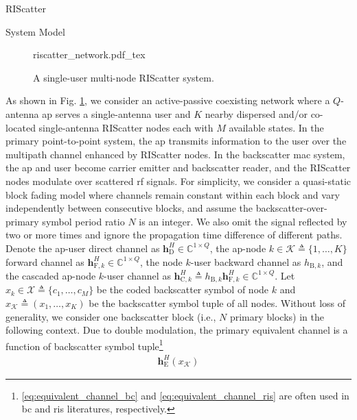\documentclass[journal]{IEEEtran}
\begin{document}
\begin{section}{RIScatter}
	\begin{subsection}{System Model}
		\begin{figure}[!t]
			\centering
			\def\svgwidth{0.8\columnwidth}
			\footnotesize{
				{riscatter_network.pdf_tex}
			}
			\caption{A single-user multi-node RIScatter system.}
			\label{fg:riscatter_network}
		\end{figure}
		As shown in Fig. \ref{fg:riscatter_network}, we consider an active-passive coexisting network where a $Q$-antenna \gls{ap} serves a single-antenna user and $K$ nearby dispersed and/or co-located single-antenna RIScatter nodes each with $M$ available states.
		In the primary point-to-point system, the \gls{ap} transmits information to the user over the multipath channel enhanced by RIScatter nodes.
		In the backscatter \gls{mac} system, the \gls{ap} and user become carrier emitter and backscatter reader, and the RIScatter nodes modulate over scattered \gls{rf} signals.
		For simplicity, we consider a quasi-static block fading model where channels remain constant within each block and vary independently between consecutive blocks, and assume the backscatter-over-primary symbol period ratio $N$ is an integer.
		We also omit the signal reflected by two or more times and ignore the propagation time difference of different paths.
		Denote the \gls{ap}-user direct channel as $\boldsymbol{h}_{\mathrm{D}}^H \in \mathbb{C}^{1 \times Q}$, the \gls{ap}-node $k \in \mathcal{K} \triangleq \{1,\ldots,K\}$ forward channel as $\boldsymbol{h}_{\mathrm{F},k}^H \in \mathbb{C}^{1 \times Q}$, the node $k$-user backward channel as $h_{\mathrm{B},k}$, and the cascaded \gls{ap}-node $k$-user channel as $\boldsymbol{h}_{\mathrm{C},k}^H \triangleq h_{\mathrm{B},k} \boldsymbol{h}_{\mathrm{F},k}^H \in \mathbb{C}^{1 \times Q}$.
		Let $x_k \in \mathcal{X} \triangleq \{c_1,\ldots,c_M\}$ be the coded backscatter symbol of node $k$ and $x_{\mathcal{K}} \triangleq (x_1,\ldots,x_K)$ be the backscatter symbol tuple of all nodes.
		Without loss of generality, we consider one backscatter block (i.e., $N$ primary blocks) in the following context.
		Due to double modulation, the primary equivalent channel is a function of backscatter symbol tuple\footnote{\eqref{eq:equivalent_channel_bc} and \eqref{eq:equivalent_channel_ris} are often used in \gls{bc} and \gls{ris} literatures, respectively.}
		\begin{subequations}
			\label{eq:equivalent_channel}
			\begin{align}
				\boldsymbol{h}_{\mathrm{E}}^H(x_{\mathcal{K}})

\end{align}
\end{subequations}
\end{subsection}
\end{section}
\end{document}
